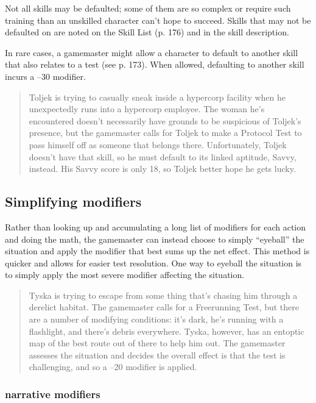 Not all skills may be defaulted; some of them are so complex or require such training than an unskilled character can't hope to succeed. Skills that may not be defaulted on are noted on the Skill List (p. 176) and in the skill description.

In rare cases, a gamemaster might allow a character to default to another skill that also relates to a test (see p. 173). When allowed, defaulting to another skill incurs a –30 modifier.

\begin{quotation}
Toljek is trying to casually sneak inside a hypercorp facility when he unexpectedly runs into a hypercorp employee. The woman he's encountered doesn't necessarily have grounds to be suspicious of Toljek's presence, but the gamemaster calls for Toljek to make a Protocol Test to pass himself off as someone that belongs there. Unfortunately, Toljek doesn't have that skill, so he must default to its linked aptitude, Savvy, instead. His Savvy score is only 18, so Toljek better hope he gets lucky.
\end{quotation}

\subsection{Simplifying modifiers}
\label{sec:simpl-modif}

Rather than looking up and accumulating a long list of modifiers for each action and doing the math, the gamemaster can instead choose to simply “eyeball” the situation and apply the modifier that best sums up the net effect. This method is quicker and allows for easier test resolution. One way to eyeball the situation is to simply apply the most severe modifier affecting the situation.

\begin{quotation}
Tyska is trying to escape from some thing that's chasing him through a derelict habitat. The gamemaster calls for a Freerunning Test, but there are a number of modifying conditions: it's dark, he's running with a flashlight, and there's debris everywhere. Tyska, however, has an entoptic map of the best route out of there to help him out. The gamemaster assesses the situation and decides the overall effect is that the test is challenging, and so a –20 modifier is applied.
\end{quotation}

\subsubsection{narrative modifiers}
\label{sec:narrative-modifiers}


